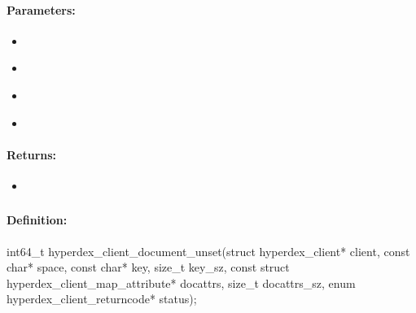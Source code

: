 \paragraph{Parameters:}
\begin{itemize}[noitemsep]
\item {}\\

\item {}\\

\item {}\\

\item {}\\

\end{itemize}

\paragraph{Returns:}
\begin{itemize}[noitemsep]
\item {}\\

\end{itemize}

\pagebreak
\subsubsection{}
\label{api:c:document_unset}


\paragraph{Definition:}
\begin{ccode}
int64_t hyperdex_client_document_unset(struct hyperdex_client* client,
        const char* space,
        const char* key, size_t key_sz,
        const struct hyperdex_client_map_attribute* docattrs, size_t docattrs_sz,
        enum hyperdex_client_returncode* status);
\end{ccode}

